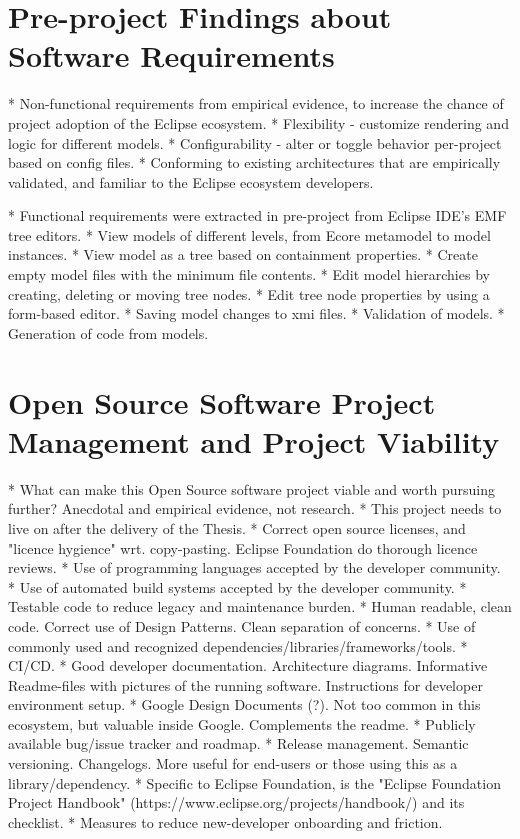 \section{Pre-project Findings about Software Requirements}

* Non-functional requirements from empirical evidence, to increase the chance of project adoption of the Eclipse ecosystem.
    * Flexibility - customize rendering and logic for different models.
    * Configurability - alter or toggle behavior per-project based on config files.
    * Conforming to existing architectures that are empirically validated, and familiar to the Eclipse ecosystem developers.

* Functional requirements were extracted in pre-project from Eclipse IDE's EMF tree editors.
  * View models of different levels, from Ecore metamodel to model instances.
  * View model as a tree based on containment properties.
  * Create empty model files with the minimum file contents.
  * Edit model hierarchies by creating, deleting or moving tree nodes.
  * Edit tree node properties by using a form-based editor.
  * Saving model changes to xmi files.
  * Validation of models.
  * Generation of code from models.


\section{Open Source Software Project Management and Project Viability}

* What can make this Open Source software project viable and worth pursuing further? Anecdotal and empirical evidence, not research.
  * This project needs to live on after the delivery of the Thesis.
  * Correct open source licenses, and "licence hygience" wrt. copy-pasting. Eclipse Foundation do thorough licence reviews.
  * Use of programming languages accepted by the developer community.
  * Use of automated build systems accepted by the developer community.
  * Testable code to reduce legacy and maintenance burden.
  * Human readable, clean code. Correct use of Design Patterns. Clean separation of concerns.
  * Use of commonly used and recognized dependencies/libraries/frameworks/tools.
  * CI/CD.
  * Good developer documentation. Architecture diagrams. Informative Readme-files with pictures of the running software. Instructions for developer environment setup.
  * Google Design Documents (?). Not too common in this ecosystem, but valuable inside Google. Complements the readme.
  * Publicly available bug/issue tracker and roadmap.
  * Release management. Semantic versioning. Changelogs. More useful for end-users or those using this as a library/dependency.
  * Specific to Eclipse Foundation, is the "Eclipse Foundation Project Handbook" (https://www.eclipse.org/projects/handbook/) and its checklist.
  * Measures to reduce new-developer onboarding and friction.
